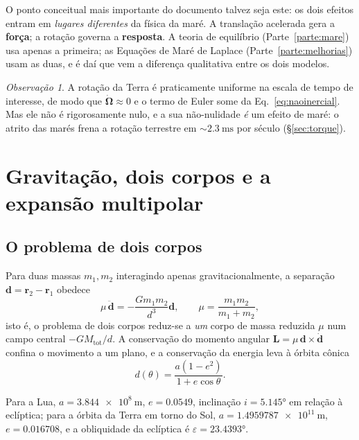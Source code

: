 \documentclass[11pt,a4paper,oneside]{report}
\theoremstyle{definition}
\theoremstyle{plain}
\theoremstyle{remark}
\newtheorem{observacao}[definicao]{Observação}
\newcommand{\vect}[1]{\bm{#1}}
\begin{document}
O ponto conceitual mais importante do documento talvez seja este: os dois
efeitos entram em \emph{lugares diferentes} da física da maré. A translação
acelerada gera a \textbf{força}; a rotação governa a \textbf{resposta}. A
teoria de equilíbrio (Parte~\ref{parte:mare}) usa apenas a primeira; as
Equações de Maré de Laplace (Parte~\ref{parte:melhorias}) usam as duas, e é daí
que vem a diferença qualitativa entre os dois modelos.

\begin{observacao}
A rotação da Terra é praticamente uniforme na escala de tempo de interesse, de
modo que $\dot{\vect\Omega}\approx 0$ e o termo de Euler some da
Eq.~\eqref{eq:naoinercial}. Mas ele não é rigorosamente nulo, e a sua
não-nulidade \emph{é} um efeito de maré: o atrito das marés frena a rotação
terrestre em $\sim\SI{2.3}{\milli\second} $ por século
(\S\ref{sec:torque}).
\end{observacao}

\chapter{Gravitação, dois corpos e a expansão multipolar}
\label{cap:gravitacao}

\section{O problema de dois corpos}

Para duas massas $m_1,m_2$ interagindo apenas gravitacionalmente, a separação
$\vect{d}=\vect{r}_2-\vect{r}_1$ obedece
\begin{equation}
\mu\,\ddot{\vect{d}} = -\frac{G m_1 m_2}{d^{3}}\vect{d},
\qquad \mu=\frac{m_1m_2}{m_1+m_2},
\end{equation}
isto é, o problema de dois corpos reduz-se a \emph{um} corpo de massa reduzida
$\mu$ num campo central $-GM_{\text{tot}}/d$. A conservação do momento angular
$\vect{L}=\mu\,\vect{d}\times\dot{\vect{d}}$ confina o movimento a um plano, e
a conservação da energia leva à órbita cônica
\begin{equation}
d(\theta)=\frac{a(1-e^{2})}{1+e\cos\theta}.
\end{equation}

Para a Lua, $a=\SI{3.844e8}{\meter}$, $e=0.0549$, inclinação
$i=\ang{5.145}$ em relação à eclíptica; para a órbita da Terra em torno do Sol,
$a=\SI{1.4959787e11}{\meter}$, $e=0.016708$, e a obliquidade da eclíptica é
$\varepsilon=\ang{23.4393}$.
\end{document}
